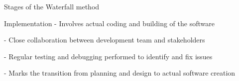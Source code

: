 \begin{frame}{Stages of the Waterfall method}

    \begin{block}{Implementation}
        - Involves actual coding and building of the software
        
        - Close collaboration between development team and stakeholders
        
        - Regular testing and debugging performed to identify and fix issues
        
        - Marks the transition from planning and design to actual software creation
        
    \end{block}   

\end{frame}